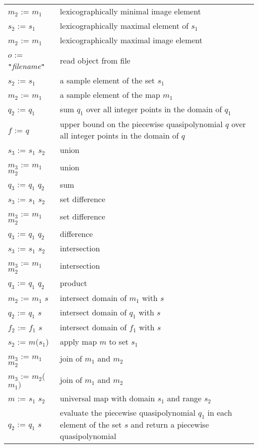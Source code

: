 \begin{supertabular}{lp{0.7\textwidth}}
$m_2$ :=  $m_1$ &
lexicographically minimal image element
\\
$s_2$ :=  $s_1$ &
lexicographically maximal element of $s_1$
\\
$m_2$ :=  $m_1$ &
lexicographically maximal image element
\\
$o$ :=  {\tt "}{\it filename}{\tt"} &
read object from file
\\
$s_2$ :=  $s_1$ &
a sample element of the set $s_1$
\\
$m_2$ :=  $m_1$ &
a sample element of the map $m_1$
\\
$q_2$ :=  $q_1$ &
sum $q_1$ over all integer points in the domain of $q_1$
\\
$f$ :=  $q$ &
upper bound on the piecewise quasipolynomial $q$ over
all integer points in the domain of $q$
\\
$s_3$ := $s_1$ \ai{$+$} $s_2$ & union
\\
$m_3$ := $m_1$ \ai{$+$} $m_2$ & union
\\
$q_3$ := $q_1$ \ai{$+$} $q_2$ & sum
\\
$s_3$ := $s_1$ \ai{$-$} $s_2$ & set difference
\\
$m_3$ := $m_1$ \ai{$-$} $m_2$ & set difference
\\
$q_3$ := $q_1$ \ai{$-$} $q_2$ & difference
\\
$s_3$ := $s_1$ \ai{$*$} $s_2$ & intersection
\\
$m_3$ := $m_1$ \ai{$*$} $m_2$ & intersection
\\
$q_3$ := $q_1$ \ai{$*$} $q_2$ & product
\\
$m_2$ := $m_1$ \ai{$*$} $s$ & intersect domain of $m_1$ with $s$
\\
$q_2$ := $q_1$ \ai{$*$} $s$ & intersect domain of $q_1$ with $s$
\\
$f_2$ := $f_1$ \ai{$*$} $s$ & intersect domain of $f_1$ with $s$
\\
$s_2$ := $m$($s_1$) & apply map $m$ to set $s_1$
\\
$m_3$ := $m_1$  $m_2$ & join of $m_1$ and $m_2$
\\
$m_3$ := $m_2$($m_1)$ & join of $m_1$ and $m_2$
\\
$m$ := $s_1$ \ai[\tt]{->} $s_2$ & universal map with domain $s_1$
and range $s_2$
\\
$q_2$ := $q_1$  $s$ &
evaluate the piecewise quasipolynomial $q_1$ in each element
of the set $s$ and return a piecewise quasipolynomial

\end{supertabular}
